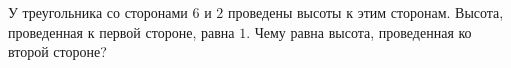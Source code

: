 \begin{ex}
	\begin{condition}
		У треугольника со сторонами \( 6 \) и \( 2 \) проведены высоты к этим сторонам. Высота, проведенная к первой стороне, равна \( 1 \). Чему равна высота, проведенная ко второй стороне?
	\end{condition}
\end{ex}